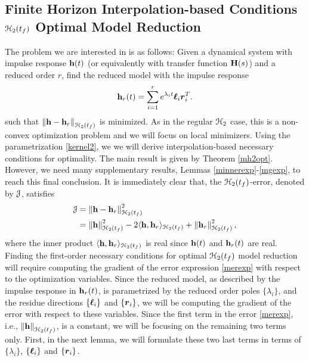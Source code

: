 \documentclass[twocolumn]{autart}
\begin{document}
\subsection{Finite Horizon Interpolation-based Conditions $\EuScript{H}_2(t_f)$ Optimal Model Reduction}
The problem we are interested in is as follows: Given a dynamical system with impulse response $\mathbf{h}(t)$ (or equivalently with transfer function $\mathbf{H}(s)$) and a reduced order $r$, find the reduced model with the impulse response 
\begin{equation}\label{kernel2}
\begin{aligned}
\mathbf{h}_r(t)=\sum_{i=1}^r e^{\lambda_it}\boldsymbol{\ell}_i\boldsymbol{r}_i^T.
\end{aligned}
\end{equation}
such that $\left\lVert\mathbf{h} - \mathbf{h}_r\right\rVert_{\EuScript{H}_2(t_f)}$ is minimized. As in the regular $\EuScript{H}_2$ case, this is a non-convex optimization problem and we will focus on local minimizers. Using the parametrization \eqref{kernel2}, we we will derive interpolation-based necessary conditions for optimality.
The main result is given by Theorem \ref{mh2opt}. However, we  need many supplementary results, Lemmas 
\ref{minnerexp}-\ref{mgexp}, to reach this final conclusion. It is immediately clear that, the $\EuScript{H}_2(t_f)$-error, denoted by $\EuScript{J}$, satisfies 
\begin{equation}\label{merexp}
\begin{aligned}
\EuScript{J}&=\left\lVert\mathbf{h}-\mathbf{h}_r\right\rVert_{\EuScript{H}_2({t_f})}^2\\
&=\left\lVert\mathbf{h}\right\rVert_{\EuScript{H}_2({t_f})}^2-2 \langle\mathbf{h}, \mathbf{h}_r\rangle_{\EuScript{H}_2({t_f})}+\left\lVert\mathbf{h}_r\right\rVert_{\EuScript{H}_2({t_f})}^2,
\end{aligned}
\end{equation}
where the inner product  $\langle\mathbf{h}, \mathbf{h}_r\rangle_{\EuScript{H}_2({t_f})}$ is real since $\mathbf{h}(t)$ and $\mathbf{h}_r(t)$ are real.
Finding the first-order necessary conditions for optimal ${\EuScript{H}_2({t_f})}$ model reduction will require computing the gradient of the error expression \eqref{merexp} with respect to the optimization variables. 
Since the reduced model, as described by  the impulse response in $\mathbf{h}_r(t)$, is parametrized by the 
reduced order poles $\{\lambda_i\}$, and the residue directions $\{\boldsymbol{\ell}_i\}$ and $\{\boldsymbol{r}_i\}$, we will be computing the gradient of the error with respect to these variables. Since the first term in the error \eqref{merexp}, i.e., $\left\lVert\mathbf{h}\right\rVert_{\EuScript{H}_2({t_f})}$, is a constant, we will be focusing on the remaining two terms only. First, in the next lemma, we will formulate these two last terms in terms of $\{\lambda_i\}$, 
$\{\boldsymbol{\ell}_i\}$ and $\{\boldsymbol{r}_i\}$.
\end{document}
